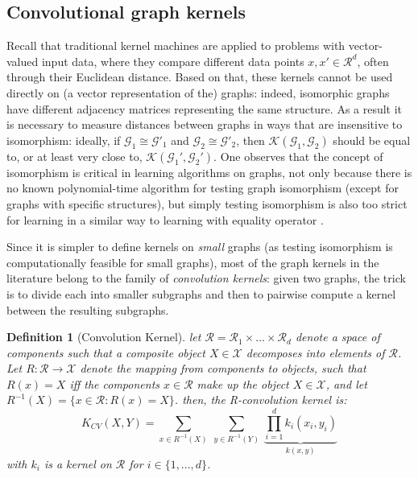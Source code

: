 \subsection{Convolutional graph kernels}
Recall that traditional kernel machines are applied to problems with vector-valued input data, where they compare different data points $x,x' \in \mathcal{R}^d$,  often through their Euclidean distance. Based on that, these kernels cannot be used directly on (a vector representation of the) graphs: indeed, isomorphic graphs have different adjacency matrices representing the same structure. As a result it is necessary to measure distances between graphs in ways that are insensitive to isomorphism: ideally, if $\mathcal{G}_1 \cong \mathcal{G}'_1$ and $\mathcal{G}_2 \cong \mathcal{G}'_2$, then $\mathcal{K}(\mathcal{G}_1, \mathcal{G}_2)$ should be equal to, or at least very close to, $\mathcal{K}(\mathcal{G}_1', \mathcal{G}_2')$. One observes that the concept of isomorphism is critical in learning algorithms on graphs, not only because there is no known polynomial-time algorithm for testing graph isomorphism (except for graphs with specific structures), but simply testing isomorphism is also too strict for learning in a similar way to learning with equality operator  \citep{kriege_graph_kernels}.

Since it is simpler to define kernels on \emph{small} graphs (as testing isomorphism is computationally feasible for small graphs), most of the graph kernels in the literature belong to the family of \emph{convolution kernels}: given two graphs, the trick is to divide each into smaller subgraphs and then to pairwise compute a kernel between the resulting subgraphs.
\newtheorem{definition}{Definition} 
\begin{definition}[Convolution Kernel]
let $\mathcal{R}=\mathcal{R}_1\times...\times \mathcal{R}_d$ denote a space of components such that a composite object $X\in \mathcal{X}$ decomposes into elements of $\mathcal{R}$. Let $R:\mathcal{R}\xrightarrow{}\mathcal{X}$ denote the mapping from components to objects, such that $R(x)=X$ iff the components $x\in \mathcal{R}$ make up the object $X\in \mathcal{X}$, and let $R^{-1}(X)=\{x\in\mathcal{R}:R(x)=X\}$. then, the R-convolution kernel is:
\begin{equation}
\label{eq:conolutional_kernels}
    K_{CV}(X,Y)=\sum_{x\in R^{-1}(X)}~\sum_{y\in R^{-1}(Y)}~\underbrace{\prod_{i=1}^{d}k_i(x_i,y_i)}_{k(x,y)}
\end{equation}
with $k_i$ is a kernel on $\mathcal{R}$ for $i\in\{1,...,d\}$.
\end{definition}

